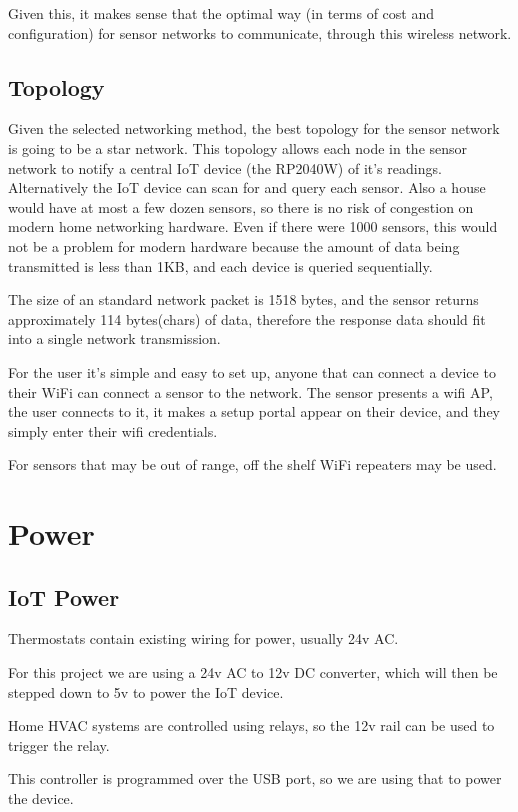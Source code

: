 \documentclass[10pt, journal]{IEEEtran} %
\begin{document}
Given this, it makes sense that the optimal way (in terms of cost and configuration) for sensor networks to communicate,
through this wireless network.

\subsection{Topology}

Given the selected networking method, the best topology for the sensor network is going to be a star network. 
This topology allows each node in the sensor network to notify a central IoT device (the RP2040W) of it's readings.
Alternatively the IoT device can scan for and query each sensor.
Also a house would have at most a few dozen sensors, so there is no risk of congestion on modern home networking hardware.
Even if there were 1000 sensors, this would not be a problem for modern hardware because the amount of data being transmitted is less than 1KB,
and each device is queried sequentially.

The size of an standard network packet is 1518 bytes, 
and the sensor returns approximately 114 bytes(chars) of data,
therefore the response data should fit into a single network transmission.

For the user it's simple and easy to set up, anyone that can connect a device to their WiFi can connect a sensor to the network.
The sensor presents a wifi AP, 
the user connects to it, 
it makes a setup portal appear on their device, 
and they simply enter their wifi credentials.

For sensors that may be out of range,
off the shelf WiFi repeaters may be used.

\section{Power}

\subsection{IoT Power}

Thermostats contain existing wiring for power, usually 24v AC.

For this project we are using a 24v AC to 12v DC converter, 
which will then be stepped down to 5v to power the IoT device.

Home HVAC systems are controlled using relays,
so the 12v rail can be used to trigger the relay.

This controller is programmed over the USB port,
so we are using that to power the device.
\end{document}

